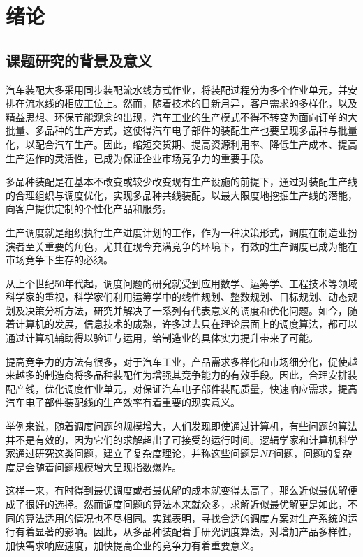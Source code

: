 \chapter{绪论}
\section{课题研究的背景及意义}

汽车装配大多采用同步装配流水线方式作业，将装配过程分为多个作业单元，并安排在流水线的相应工位上。然而，随着技术的日新月异，客户需求的多样化，以及精益思想、环保节能观念的出现，汽车工业的生产模式不得不转变为面向订单的大批量、多品种的生产方式，这使得汽车电子部件的装配生产也要呈现多品种与批量化，以配合汽车生产。因此，缩短交货期、提高资源利用率、降低生产成本、提高生产运作的灵活性，已成为保证企业市场竞争力的重要手段。

多品种装配是在基本不改变或较少改变现有生产设施的前提下，通过对装配生产线的合理组织与调度优化，实现多品种共线装配，以最大限度地挖掘生产线的潜能，向客户提供定制的个性化产品和服务。

生产调度就是组织执行生产进度计划的工作，作为一种决策形式，调度在制造业扮演者至关重要的角色，尤其在现今充满竞争的环境下，有效的生产调度已成为能在市场竞争下生存的必须。

从上个世纪50年代起，调度问题的研究就受到应用数学、运筹学、工程技术等领域科学家的重视，科学家们利用运筹学中的线性规划、整数规划、目标规划、动态规划及决策分析方法，研究并解决了一系列有代表意义的调度和优化问题\cite{徐俊刚2004}。如今，随着计算机的发展，信息技术的成熟，许多过去只在理论层面上的调度算法，都可以通过计算机辅助得以验证与运用，给制造业的具体实力提升带来了可能。

提高竞争力的方法有很多，对于汽车工业，产品需求多样化和市场细分化，促使越来越多的制造商将多品种装配作为增强其竞争能力的有效手段。因此，合理安排装配产线，优化调度作业单元，对保证汽车电子部件装配质量，快速响应需求，提高汽车电子部件装配线的生产效率有着重要的现实意义。

举例来说，随着调度问题的规模增大，人们发现即使通过计算机，有些问题的算法并不是有效的，因为它们的求解超出了可接受的运行时间。逻辑学家和计算机科学家通过研究这类问题，建立了复杂度理论，并称这些问题是$NP$问题，问题的复杂度是会随着问题规模增大呈现指数爆炸。

这样一来，有时得到最优调度或者最优解的成本就变得太高了，那么近似最优解便成了很好的选择。然而调度问题的算法本来就众多，求解近似最优解更是如此，不同的算法适用的情况也不尽相同。实践表明，寻找合适的调度方案对生产系统的运行有着显著的影响。因此，从多品种装配着手研究调度算法，对增加产品多样性，加快需求响应速度，加快提高企业的竞争力有着重要意义。


